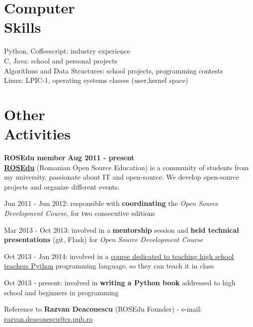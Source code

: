 \documentclass[margin,line]{resume}
\begin{document}
\begin{resume}
    \section{\mysidestyle Computer\\Skills}

	Python, Coffeescript: industry experience\\
	C, Java: school and personal projects\\
	Algorithms and Data Structures: school projects, programming contests\\
	Linux: LPIC-1, operating systems classes (user,kernel space)


    \section{\mysidestyle Other\\Activities}

    \vspace{1.2mm}\textbf{ROSEdu member} \hfill \textbf{Aug 2011 - present} \vspace{1.5mm}\\
	\href{http://rosedu.org/}{\textbf{ROSEdu}} (Romanian Open Source Education) is a community of
	students from my university, passionate about IT and open-source. We develop
	open-source projects and organize different events.\vspace{1mm}
	\begin{list2}
        \item Jun 2011 - Jun 2012: responsible with \textbf{coordinating} the \textit{Open Source Development Course}, for two consecutive editions
        \item Mar 2013 - Oct 2013: involved in a \textbf{mentorship} session and \textbf{held technical presentations} (git, Flask) for \textit{Open Source Development Course}
        \item Oct 2013 - Jan 2014: involved in a \href{http://py4school.rosedu.org/}{course dedicated to teaching high school teachers Python} programming language, so they can teach it in class
        \item Oct 2013 - present: involved in \textbf{writing a Python book} addressed to high school and beginners in programming
	\end{list2}\vspace{-3mm}
	\small{Reference to \textbf{Razvan Deaconescu} (ROSEdu Founder)
		- e-mail: \href{mailto:razvan.deaconescu@cs.pub.ro}{razvan.deaconescu@cs.pub.ro}}


\end{resume}
\end{document}

